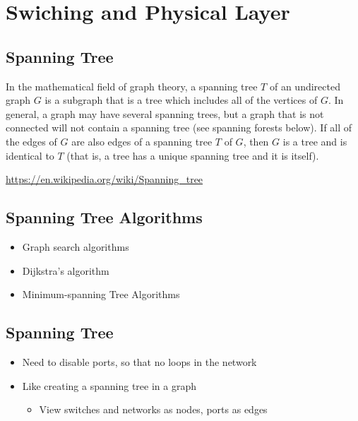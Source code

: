 \section{Swiching and Physical Layer}
\subsection{Spanning Tree}
\begin{tcolorbox}[colframe=red!40!white,colback=yellow!20,title=Spanning tree]
    In the mathematical field of graph theory, a spanning tree $T$ of an undirected graph $G$ is a subgraph that is a tree which includes all of the vertices of $G$. In general, a graph may have several spanning trees, but a graph that is not connected will not contain a spanning tree (see spanning forests below). If all of the edges of $G$ are also edges of a spanning tree $T$ of $G$, then $G$ is a tree and is identical to $T$ (that is, a tree has a unique spanning tree and it is itself).
\end{tcolorbox}
\url{https://en.wikipedia.org/wiki/Spanning_tree}

\subsection{Spanning Tree Algorithms}
\begin{itemize}[nosep]
    \item Graph search algorithms
    \item Dijkstra's algorithm
    \item Minimum-spanning Tree Algorithms
\end{itemize}

\subsection{Spanning Tree}
\begin{itemize}[nosep]
    \item Need to disable ports, so that no loops in the network
    \item Like creating a spanning tree in a graph
          \begin{itemize}[nosep]
              \item View switches and networks as nodes, ports as edges
          \end{itemize}
\end{itemize}

